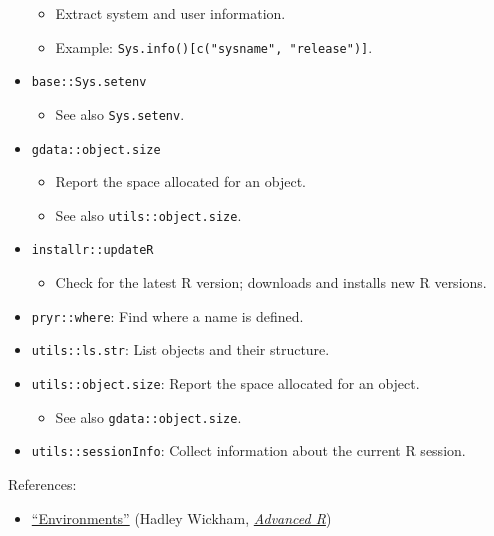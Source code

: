 \documentclass[
]{book}
\providecommand{\tightlist}{%
  \setlength{\itemsep}{0pt}\setlength{\parskip}{0pt}}
\begin{document}
\begin{itemize}
  \begin{itemize}
  \tightlist
  \item
    Extract system and user information.
  \item
    Example: \texttt{Sys.info(){[}c("sysname",\ "release"){]}}.
  \end{itemize}
\item
  \texttt{base::Sys.setenv}

  \begin{itemize}
  \tightlist
  \item
    See also \texttt{Sys.setenv}.
  \end{itemize}
\item
  \texttt{gdata::object.size}

  \begin{itemize}
  \tightlist
  \item
    Report the space allocated for an object.
  \item
    See also \texttt{utils::object.size}.
  \end{itemize}
\item
  \texttt{installr::updateR}

  \begin{itemize}
  \tightlist
  \item
    Check for the latest R version; downloads and installs new R versions.
  \end{itemize}
\item
  \texttt{pryr::where}: Find where a name is defined.
\item
  \texttt{utils::ls.str}: List objects and their structure.
\item
  \texttt{utils::object.size}: Report the space allocated for an object.

  \begin{itemize}
  \tightlist
  \item
    See also \texttt{gdata::object.size}.
  \end{itemize}
\item
  \texttt{utils::sessionInfo}: Collect information about the current R session.
\end{itemize}

References:

\begin{itemize}
\tightlist
\item
  \href{http://adv-r.had.co.nz/Environments.html\#environments}{``Environments''} (Hadley Wickham, \href{http://adv-r.had.co.nz/}{\emph{Advanced R}})
\end{itemize}
\end{document}
